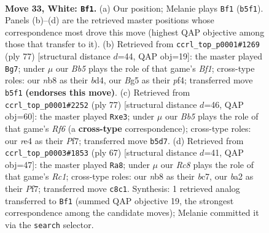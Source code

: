 \documentclass[11pt]{article}
\begin{document}
\clearpage

\begin{figure}[p]\centering
\begin{subfigure}{0.46\textwidth}\centering
\resizebox{\linewidth}{!}{%
\newchessgame
\chessboard[
  setfen={rnR5/6k1/4p3/1B4Bp/4r3/5p1P/bR3P2/6K1 w - - 2 33},
  showmover=false,
  pgfstyle=straightmove, color=movearrow, markmove={b5-f1}
]}
\caption{}
\end{subfigure}\hfill
\begin{subfigure}{0.46\textwidth}\centering
\resizebox{\linewidth}{!}{%
\newchessgame
\chessboard[
  setfen={3r1b2/5k1p/6p1/8/2RB1P2/r7/PR1K2PP/8 b - - 2 39},
  showmover=false,
  pgfstyle=straightmove, color=movearrow, markmove={f8-g7}
]}
\caption{}
\end{subfigure}
\\[4pt]
\begin{subfigure}{0.46\textwidth}\centering
\resizebox{\linewidth}{!}{%
\newchessgame
\chessboard[
  setfen={8/p3kp2/8/8/1P4Rb/P3Pr2/3R4/2rN2K1 b - - 6 39},
  showmover=false,
  pgfstyle=straightmove, color=movearrow, markmove={f3-e3}
]}
\caption{}
\end{subfigure}\hfill
\begin{subfigure}{0.46\textwidth}\centering
\resizebox{\linewidth}{!}{%
\newchessgame
\chessboard[
  setfen={2r3k1/2B2p2/P4R2/1r2p1Pp/4b2P/2R5/8/4K3 b - - 4 34},
  showmover=false,
  pgfstyle=straightmove, color=movearrow, markmove={c8-a8}
]}
\caption{}
\end{subfigure}
\caption{\textbf{Move 33, White: \texttt{Bf1}.} (a) Our position; Melanie plays \texttt{Bf1} (\texttt{b5f1}). Panels (b)--(d) are the retrieved master positions whose correspondence most drove this move (highest QAP objective among those that transfer to it). (b) Retrieved from \texttt{ccrl\_top\_p0001\#1269} (ply 77) [structural distance $d$=44, QAP obj=19]: the master played \texttt{Bg7}; under $\mu$ our \emph{Bb5} plays the role of that game's \emph{Bf1}; cross-type roles: our \emph{n}b8 as their \emph{b}d4, our \emph{B}g5 as their \emph{p}f4; transferred move \texttt{b5f1} \textbf{(endorses this move)}. (c) Retrieved from \texttt{ccrl\_top\_p0001\#2252} (ply 77) [structural distance $d$=46, QAP obj=60]: the master played \texttt{Rxe3}; under $\mu$ our \emph{Bb5} plays the role of that game's \emph{Rf6} (a \textbf{cross-type} correspondence); cross-type roles: our \emph{r}e4 as their \emph{P}f7; transferred move \texttt{b5d7}. (d) Retrieved from \texttt{ccrl\_top\_p0003\#1853} (ply 67) [structural distance $d$=41, QAP obj=47]: the master played \texttt{Ra8}; under $\mu$ our \emph{Rc8} plays the role of that game's \emph{Rc1}; cross-type roles: our \emph{n}b8 as their \emph{b}c7, our \emph{b}a2 as their \emph{P}f7; transferred move \texttt{c8c1}. Synthesis: 1 retrieved analog transferred to \texttt{Bf1} (summed QAP objective 19, the strongest correspondence among the candidate moves); Melanie committed it via the \texttt{search} selector.}
\label{fig:thought-m64}
\end{figure}
\end{document}
